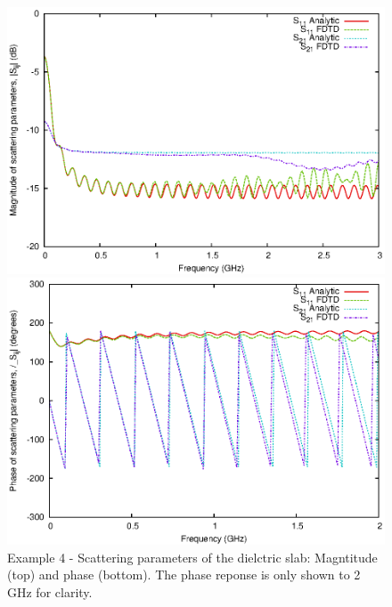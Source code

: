\documentclass[onecolumn,a4paper]{article}
\numberwithin{equation}{section}
\begin{document}
\begin{figure}[ht!]
  \centerline{\includegraphics[width=12cm]{figures/parplate1D_dielslab_Smag}}
  \centerline{\includegraphics[width=12cm]{figures/parplate1D_dielslab_Sarg}}
  \caption{\label{fg:parplate1D_dielslab_fd} Example 4 - Scattering parameters of the dielctric slab: Magntitude (top) and phase (bottom).
  The phase reponse is only shown to 2\,GHz for clarity.}
\end{figure}
\end{document}
